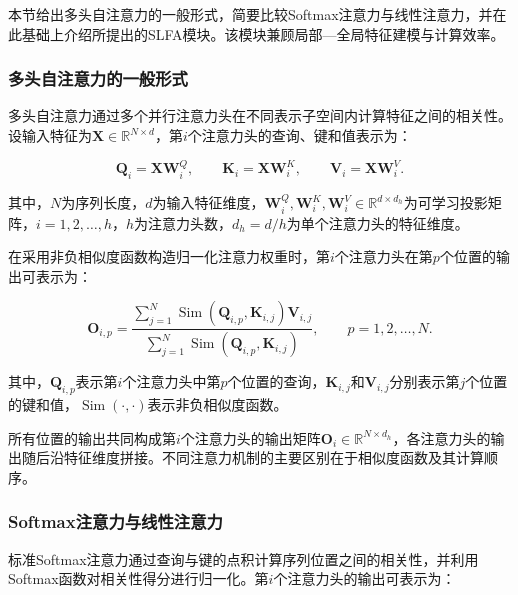 本节给出多头自注意力的一般形式，简要比较Softmax注意力与线性注意力，并在此基础上介绍所提出的SLFA模块。该模块兼顾局部—全局特征建模与计算效率。


\subsubsection{多头自注意力的一般形式}

多头自注意力通过多个并行注意力头在不同表示子空间内计算特征之间的相关性\cite{ref34}。设输入特征为$\mathbf X\in\mathbb R^{N\times d}$，第$i$个注意力头的查询、键和值表示为：

\begin{equation}
\mathbf Q_i=\mathbf X\mathbf W_i^Q,\qquad
\mathbf K_i=\mathbf X\mathbf W_i^K,\qquad
\mathbf V_i=\mathbf X\mathbf W_i^V.
\label{eq:qkv_projection}
\end{equation}

其中，$N$为序列长度，$d$为输入特征维度，$\mathbf W_i^Q,\mathbf W_i^K,\mathbf W_i^V\in\mathbb R^{d\times d_h}$为可学习投影矩阵，$i=1,2,\ldots,h$，$h$为注意力头数，$d_h=d/h$为单个注意力头的特征维度。

在采用非负相似度函数构造归一化注意力权重时，第$i$个注意力头在第$p$个位置的输出可表示为：

\begin{equation}
\mathbf O_{i,p}
=
\frac{
\displaystyle\sum_{j=1}^{N}
\operatorname{Sim}\left(\mathbf Q_{i,p},\mathbf K_{i,j}\right)\mathbf V_{i,j}
}{
\displaystyle\sum_{j=1}^{N}
\operatorname{Sim}\left(\mathbf Q_{i,p},\mathbf K_{i,j}\right)
},
\qquad p=1,2,\ldots,N.
\label{eq:general_attention}
\end{equation}

其中，$\mathbf Q_{i,p}$表示第$i$个注意力头中第$p$个位置的查询，$\mathbf K_{i,j}$和$\mathbf V_{i,j}$分别表示第$j$个位置的键和值，$\operatorname{Sim}(\cdot,\cdot)$表示非负相似度函数\cite{ref40}。

所有位置的输出共同构成第$i$个注意力头的输出矩阵$\mathbf O_i\in\mathbb R^{N\times d_h}$，各注意力头的输出随后沿特征维度拼接。不同注意力机制的主要区别在于相似度函数及其计算顺序。

\subsubsection{Softmax注意力与线性注意力}

标准Softmax注意力通过查询与键的点积计算序列位置之间的相关性，并利用Softmax函数对相关性得分进行归一化\cite{ref34}。第$i$个注意力头的输出可表示为：

